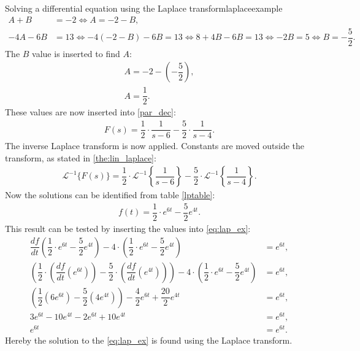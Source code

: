 \begin{example}{Solving a differential equation using the Laplace transform}{laplaceexample}
\begin{align*}
A+B &=-2 \Leftrightarrow A=-2-B, \\
-4A-6B &=13 \Leftrightarrow -4(-2-B)-6B = 13 \Leftrightarrow 8 + 4B - 6B = 13 \Leftrightarrow -2B = 5 \Leftrightarrow B = -\dfrac{5}{2}.
\end{align*}
The $B$ value is inserted to find $A$:
\begin{align*}
A=-2- \left(-\dfrac{5}{2} \right), \\
A=\dfrac{1}{2}.
\end{align*}
These values are now inserted into \eqref{par_dec}:
\begin{align*}
F(s) = \dfrac{1}{2} \cdot \dfrac{1}{s-6} - \dfrac{5}{2} \cdot \dfrac{1}{s-4}.
\end{align*}
The inverse Laplace transform is now applied. Constants are moved outside the transform, as stated in \cref{the:lin_laplace}:
\begin{align*}
\mathcal{L}^{-1} \big\{F(s) \big\} = \dfrac{1}{2} \cdot \mathcal{L}^{-1} \left\{\dfrac{1}{s-6} \right\} - \dfrac{5}{2} \cdot \mathcal{L}^{-1} \left\{\dfrac{1}{s-4} \right\}.
\end{align*}
Now the solutions can be identified from table \ref{lptable}:
\begin{align*}
f(t) = \dfrac{1}{2} \cdot e^{6t} - \dfrac{5}{2}e^{4t}.
\end{align*}
This result can be tested by inserting the values into \eqref{eq:lap_ex}:
\begin{align*}
\dfrac{df}{dt} \left(\dfrac{1}{2} \cdot e^{6t} - \dfrac{5}{2}e^{4t} \right) - 4 \cdot \left(\dfrac{1}{2} \cdot e^{6t} - \dfrac{5}{2}e^{4t} \right) &= e^{6t}, \\
\left(\dfrac{1}{2} \cdot \left(\dfrac{df}{dt} \left(e^{6t} \right) \right) - \dfrac{5}{2} \cdot \left(\dfrac{df}{dt} \left(e^{4t} \right) \right) \right) - 4 \cdot \left(\dfrac{1}{2} \cdot e^{6t} - \dfrac{5}{2} e^{4t} \right) &= e^{6t}, \\
\left(\dfrac{1}{2} \left(6e^{6t} \right) - \dfrac{5}{2} \left(4e^{4t} \right) \right) - \dfrac{4}{2}e^{6t}+\dfrac{20}{2}e^{4t}&= e^{6t},\\
3e^{6t}-10e^{4t}-2e^{6t}+10e^{4t} &= e^{6t}, \\
e^{6t} &= e^{6t}.
\end{align*}
Hereby the solution to the \eqref{eq:lap_ex} is found using the Laplace transform.
\end{example}